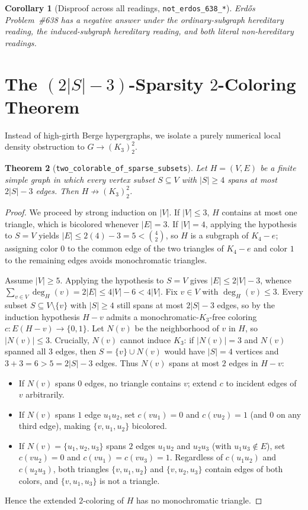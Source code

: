 \documentclass[11pt]{amsart}
\newtheorem{theorem}{Theorem}
\newtheorem{corollary}[theorem]{Corollary}
\theoremstyle{definition}
\theoremstyle{remark}
\begin{document}
\begin{corollary}[Disproof across all readings, \texttt{not\_erdos\_638\_*}]\label{cor:disproof}
Erd\H{o}s Problem~\#638 has a negative answer under the ordinary-subgraph hereditary reading, the induced-subgraph hereditary reading, and both literal non-hereditary readings.
\end{corollary}

\section{The $(2|S|-3)$-Sparsity $2$-Coloring Theorem}

Instead of high-girth Berge hypergraphs, we isolate a purely numerical local density obstruction to $G \to (K_3)^2_2$.

\begin{theorem}[\texttt{two\_colorable\_of\_sparse\_subsets}]\label{thm:sparse2col}
Let $H = (V, E)$ be a finite simple graph in which every vertex subset $S \subseteq V$ with $|S| \ge 4$ spans at most $2|S| - 3$ edges. Then $H \not\to (K_3)^2_2$.
\end{theorem}

\begin{proof}
We proceed by strong induction on $|V|$. If $|V| \le 3$, $H$ contains at most one triangle, which is bicolored whenever $|E| = 3$. If $|V| = 4$, applying the hypothesis to $S = V$ yields $|E| \le 2(4) - 3 = 5 < \binom{4}{2}$, so $H$ is a subgraph of $K_4 - e$; assigning color $0$ to the common edge of the two triangles of $K_4 - e$ and color $1$ to the remaining edges avoids monochromatic triangles.

Assume $|V| \ge 5$. Applying the hypothesis to $S = V$ gives $|E| \le 2|V| - 3$, whence $\sum_{v \in V} \deg_H(v) = 2|E| \le 4|V| - 6 < 4|V|$. Fix $v \in V$ with $\deg_H(v) \le 3$. Every subset $S \subseteq V \setminus \{v\}$ with $|S| \ge 4$ still spans at most $2|S| - 3$ edges, so by the induction hypothesis $H - v$ admits a monochromatic-$K_3$-free coloring $c : E(H - v) \to \{0, 1\}$. Let $N(v)$ be the neighborhood of $v$ in $H$, so $|N(v)| \le 3$. Crucially, $N(v)$ cannot induce $K_3$: if $|N(v)| = 3$ and $N(v)$ spanned all $3$ edges, then $S = \{v\} \cup N(v)$ would have $|S| = 4$ vertices and $3 + 3 = 6 > 5 = 2|S| - 3$ edges. Thus $N(v)$ spans at most $2$ edges in $H - v$:
\begin{itemize}
  \item If $N(v)$ spans $0$ edges, no triangle contains $v$; extend $c$ to incident edges of $v$ arbitrarily.
  \item If $N(v)$ spans $1$ edge $u_1 u_2$, set $c(v u_1) = 0$ and $c(v u_2) = 1$ (and $0$ on any third edge), making $\{v, u_1, u_2\}$ bicolored.
  \item If $N(v) = \{u_1, u_2, u_3\}$ spans $2$ edges $u_1 u_2$ and $u_2 u_3$ (with $u_1 u_3 \notin E$), set $c(v u_2) = 0$ and $c(v u_1) = c(v u_3) = 1$. Regardless of $c(u_1 u_2)$ and $c(u_2 u_3)$, both triangles $\{v, u_1, u_2\}$ and $\{v, u_2, u_3\}$ contain edges of both colors, and $\{v, u_1, u_3\}$ is not a triangle.
\end{itemize}
Hence the extended $2$-coloring of $H$ has no monochromatic triangle.
\end{proof}
\end{document}
